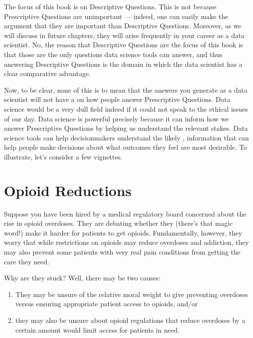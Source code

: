 \documentclass[letterpaper,10pt,english]{jupyterBook}
\begin{document}
\sphinxAtStartPar
The focus of this book is on Descriptive Questions. This is not because Prescriptive Questions are unimportant — indeed, one can easily make the argument that they are  important than Descriptive Questions. Moreover, as we will discuss in future chapters, they will arise frequently in your career as a data scientist. No, the reason that Descriptive Questions are the focus of this book is that those are the only questions data science tools can answer, and thus answering Descriptive Questions is the domain in which the data scientist has a clear comparative advantage.

\sphinxAtStartPar
Now, to be clear, none of this is to mean that the answers you generate as a data scientist will not have a  on how people answer Prescriptive Questions. Data science would be a very dull field indeed if it could not speak to the ethical issues of our day. Data science is powerful precisely because it can inform how we answer Prescriptive Questions by helping us understand the relevant stakes. Data science tools can help decision\sphinxhyphen{}makers understand the likely , information that can help people make  decisions about what outcomes they feel are most desirable. To illustrate, let’s consider a few vignettes.


\section{Opioid Reductions}
\label{\detokenize{30_questions/05_descriptive_v_prescriptive:opioid-reductions}}
\sphinxAtStartPar
Suppose you have been hired by a medical regulatory board concerned about the rise in opioid overdoses. They are debating whether they  (there’s that magic word!) make it harder for patients to get opioids. Fundamentally, however, they worry that while restrictions on opioids may reduce overdoses and addiction, they may also prevent some patients with very real pain conditions from getting the care they need.

\sphinxAtStartPar
Why are they stuck? Well, there may be two causes:
\begin{enumerate}
%
\item {} 
\sphinxAtStartPar
They may be unsure of the relative moral weight to give preventing overdoses versus ensuring appropriate patient access to opioids, and/or

\item {} 
\sphinxAtStartPar
they may also be unsure about  opioid regulations that reduce overdoses by a certain amount would limit access for patients in need.

\end{enumerate}
\end{document}
